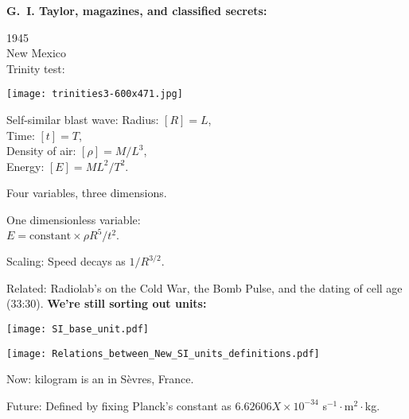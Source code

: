 \small


\textbf{G.\ I. Taylor, magazines, and classified secrets:}

1945 \\  New Mexico \\ Trinity test:
\begin{marginfigure}[]
  \texttt{[image: trinities3-600x471.jpg]}
\end{marginfigure}


Self-similar blast wave:
Radius: $[R] = L$, \\
Time: $[t] = T$,\\
Density of air: $[\rho]=M/L^{3}$,\\
Energy: $[E] = ML^{2}/T^{2}$.

Four variables, three dimensions.

One dimensionless variable:\\
$
E
= 
\mbox{constant} \times
\rho R^5 / t^2.
$

Scaling: Speed decays as $1/R^{3/2}$.


{Related: Radiolab's 
  on the Cold War, the Bomb Pulse, and the dating of cell age (33:30).}
\textbf{We're still sorting out units:}

\textbf{}

\begin{marginfigure}[]
  \texttt{[image: SI\_base\_unit.pdf]}\\
\end{marginfigure}

\begin{marginfigure}[]
  \texttt{[image: Relations\_between\_New\_SI\_units\_definitions.pdf]}\\
\end{marginfigure}



Now: kilogram is an 
in S\`{e}vres, France.

Future: 
Defined by fixing Planck's constant 
as $6.62606X \times 10^{−34}$
s$^{-1}\cdot$m$^{2}\cdot$kg.\footnotemark[3]

